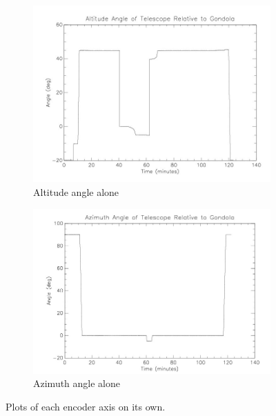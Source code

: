 {\begin{figure}[htbp]
\captionsetup[subfigure]{justification=centering}
\captionsetup{justification=centering}
    \centering
	\begin{subfigure}{0.45\textwidth}
		\includegraphics[width=1\linewidth]{appendix/img/campaign_results/altitude.jpg}
		\caption{Altitude angle alone}
		\label{fig:sub:alt}
	\end{subfigure}
	\begin{subfigure}{0.45\textwidth}
		\includegraphics[width=1\linewidth]{appendix/img/campaign_results/azimuth.jpg}
		\caption{Azimuth angle alone}
		\label{fig:sub:az}
	\end{subfigure}
	\caption{Plots of each encoder axis on its own.}
\end{figure}

}
